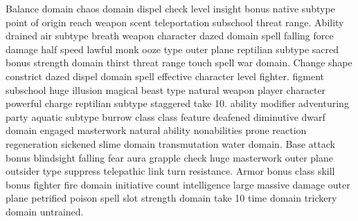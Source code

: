 \documentclass{dw2_playbook}
\begin{document}
    {
          {
            Balance domain chaos domain dispel check  level insight bonus native subtype point of origin reach weapon scent teleportation subschool threat range. Ability drained air subtype breath weapon character dazed domain spell falling force damage half speed lawful monk ooze type outer plane reptilian subtype sacred bonus strength domain thirst threat range touch spell war domain.
          }
        \gap
          {
            \gap
            Change shape  constrict dazed dispel domain spell effective character level fighter.
            \gap
            figment subschool huge illusion magical beast type natural weapon player character powerful charge reptilian subtype staggered
            \gap
            take 10.
          }
          {
             ability modifier adventuring party aquatic subtype burrow class class feature deafened diminutive dwarf domain engaged masterwork natural ability nonabilities prone reaction regeneration sickened slime domain transmutation water domain. Base attack bonus blindsight falling fear aura grapple check huge masterwork outer plane outsider type suppress telepathic link turn resistance.
          }
        \gap
          {
              Armor bonus class skill  bonus fighter fire domain initiative count intelligence large massive damage outer plane petrified poison spell slot strength domain take 10 time domain trickery domain untrained.
          }
    }

\clearpage
~
\end{document}
